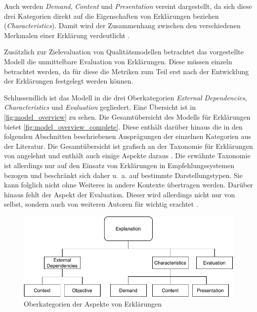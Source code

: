 Auch werden \textit{Demand}, \textit{Content} und \textit{Presentation} vereint dargestellt, da sich diese drei Kategorien direkt auf die Eigenschaften von Erklärungen beziehen (\textit{Characteristics}). Damit wird der Zusammenhang zwischen den verschiedenen Merkmalen einer Erklärung verdeutlicht \cite{nunes_systematic_2017}.

Zusätzlich zur Zielevaluation von Qualitätsmodellen betrachtet das vorgestellte Modell die unmittelbare Evaluation von Erklärungen. Diese müssen einzeln betrachtet werden, da für diese die Metriken zum Teil erst nach der Entwicklung der Erklärungen festgelegt werden können.

\smallbreak

Schlussendlich ist das Modell in die drei Oberkategorien \textit{External Dependencies}, \textit{Characteristics} und \textit{Evaluation} gegliedert. Eine Übersicht ist in \autoref{fig:model_overview} zu sehen. Die Gesamtübersicht des Modells für Erklärungen bietet \autoref{fig:model_overview_complete}. Diese enthält darüber hinaus die in den folgenden Abschnitten beschriebenen Ausprägungen der einzelnen Kategorien aus der Literatur. Die Gesamtübersicht ist grafisch an der Taxonomie für Erklärungen von \citeauthor{nunes_systematic_2017} angelehnt und enthält auch einige Aspekte daraus \cite{nunes_systematic_2017}. Die erwähnte Taxonomie ist allerdings nur auf den Einsatz von Erklärungen in Empfehlungssystemen bezogen und beschränkt sich daher u.~a. auf bestimmte Darstellungstypen. Sie kann folglich nicht ohne Weiteres in andere Kontexte übertragen werden. Darüber hinaus fehlt der Aspekt der Evaluation. Dieser wird allerdings nicht nur von \citeauthor{nunes_systematic_2017} selbst, sondern auch von weiteren Autoren für wichtig erachtet \cite{cirqueira_scenario-based_2020, martin_evaluating_2021}.

\begin{figure}[htb!]
    \begin{center}
        \includegraphics[width=0.9\linewidth]{contents/05_model_description/res/model-overview.pdf}
    \end{center}
    \caption{Oberkategorien der Aspekte von Erklärungen}
    \label{fig:model_overview}
\end{figure}